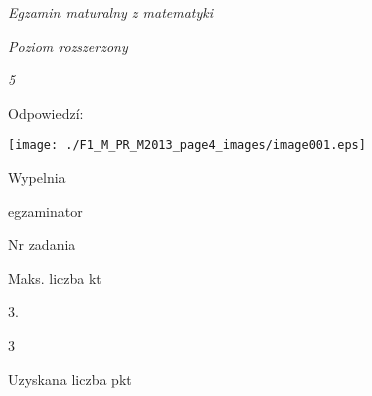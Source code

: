 \documentclass[a4paper,12pt]{article}
\begin{document}
{\it Egzamin maturalny z matematyki}

{\it Poziom rozszerzony}

{\it 5}

Odpowiedzí:
\begin{center}
\texttt{[image: ./F1\_M\_PR\_M2013\_page4\_images/image001.eps]}
\end{center}
Wypelnia

egzaminator

Nr zadania

Maks. liczba kt

3.

3

Uzyskana liczba pkt
\end{document}

